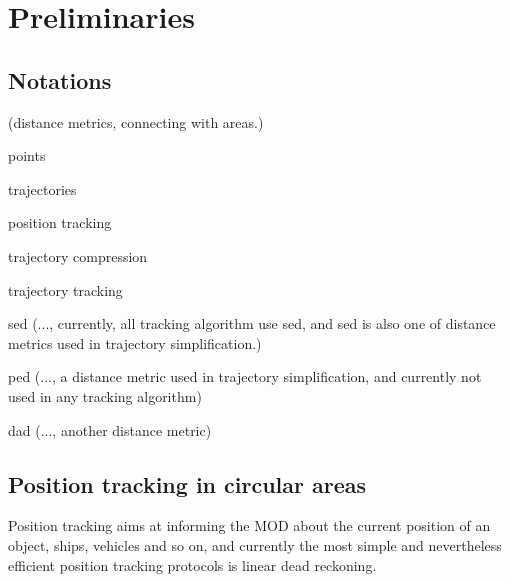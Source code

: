 



\section{Preliminaries}
\label{sec-pre}

\subsection{Notations}
(distance metrics, connecting with areas.)

points

trajectories

position tracking

trajectory compression

trajectory tracking


sed (..., currently, all tracking algorithm use sed, and sed is also one of distance metrics used in trajectory simplification.)

ped (..., a distance metric used in trajectory simplification, and currently not used in any tracking algorithm)

dad (..., another distance metric)


\subsection{Position tracking in circular areas}

Position tracking aims at informing the MOD about the current position of an object, \eg ships, vehicles and so on, and currently the most simple and nevertheless efficient position tracking protocols is linear dead reckoning.



